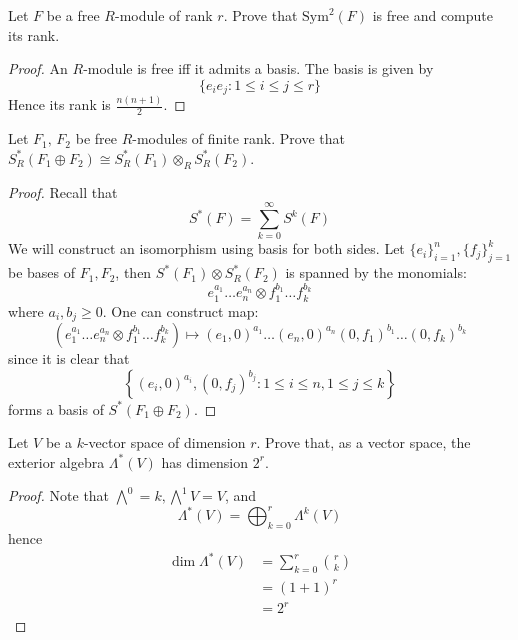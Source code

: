 \documentclass[openany]{book}
\begin{document}
\begin{prob}[4.14]
    Let $F$ be a free $R$-module of rank $r$. Prove that $\text{Sym}^2(F)$ is free and compute its rank.
\end{prob}
\begin{proof}
    An $R$-module is free iff it admits a basis. The basis is given by 
    \begin{equation*}
        \{e_ie_j: 1\leq i\leq j\leq r\}
    \end{equation*}
    Hence its rank is $\frac{n(n+1)}{2}$.
\end{proof}



\begin{prob}[4.15]
        Let \( F_1, \, F_2 \) be free \( R \)-modules of finite rank. Prove that \( S_R^*(F_1 \oplus F_2) \cong S_R^*(F_1) \otimes_R S_R^*(F_2) \).
\end{prob}
\begin{proof}
    Recall that 
    \begin{equation*}
        S^*(F)=\sum_{k=0}^\infty S^k(F)
    \end{equation*}
    We will construct an isomorphism using basis for both sides. Let $\{e_i\}_{i=1}^n, \{f_j\}_{j=1}^k$ be bases of $F_1,F_2$, then $S^*(F_1)\otimes S_R^*(F_2)$ is spanned by the monomials:
    \begin{equation*}
        e_1^{a_1}\dots e_n^{a_n}\otimes f_1^{b_1}\dots f_k^{b_k}
    \end{equation*}
    where $a_i,b_j\geq 0$. One can construct map:
    \begin{equation*}
        \left(e_1^{a_1}\dots e_n^{a_n}\otimes f_1^{b_1}\dots f_k^{b_k}\right)\mapsto (e_1,0)^{a_1}\dots(e_n,0)^{a_n}(0,f_1)^{b_1}\dots(0,f_k)^{b_k}
    \end{equation*}
    since it is clear that 
    \begin{equation*}
        \left\{(e_i,0)^{a_i}, (0,f_j)^{b_j}: 1\leq i\leq n, 1\leq j\leq k\right\}
    \end{equation*}
    forms a basis of $S^*(F_1\oplus F_2)$.
\end{proof}
        

        
\begin{prob}[4.17]
        Let \( V \) be a \( k \)-vector space of dimension \( r \). Prove that, as a vector space, the exterior algebra \( \Lambda^*(V) \) has dimension \( 2^r \).
\end{prob}
\begin{proof}
    Note that $\bigwedge^0=k, \bigwedge^1V=V$, and 
    \begin{equation*}
        \Lambda^*(V)=\bigoplus_{k=0}^r\Lambda^k(V)
    \end{equation*}
    hence
    \begin{align*}
        \dim\Lambda^*(V)&=\sum_{k=0}^r\binom{r}{k}\\
        &=(1+1)^r\\
        &=2^r
    \end{align*}
\end{proof}
\end{document}
